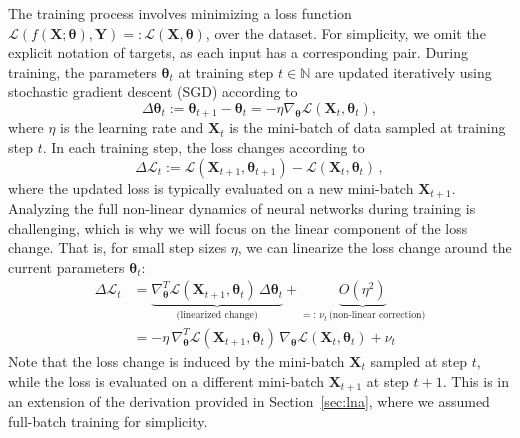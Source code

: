 The training process involves minimizing a loss function \(\mathcal{L}(f(\mathbf{X}; \boldsymbol{\theta}), \mathbf{Y}) =: \mathcal{L}(\mathbf{X}, \boldsymbol{\theta})\), over the dataset. For simplicity, we omit the explicit notation of targets, as each input has a corresponding pair.
During training, the parameters \(\boldsymbol{\theta}_t\) at training step \(t \in \mathbb{N}\) are updated iteratively using stochastic gradient descent (SGD) according to
\begin{equation}
\Delta \boldsymbol{\theta}_t := \boldsymbol{\theta}_{t+1} - \boldsymbol{\theta}_t =  - \eta \nabla_{\boldsymbol{\theta}} \mathcal{L}(\mathbf{X}_t, \boldsymbol{\theta}_t),
\end{equation}
where \(\eta\) is the learning rate and \(\mathbf{X}_t\) is the mini-batch of data sampled at training step \(t\).
In each training step, the loss changes according to
\begin{equation}
    \Delta \mathcal{L}_t := \mathcal{L}(\mathbf{X}_{t+1}, \boldsymbol{\theta}_{t+1}) - \mathcal{L}(\mathbf{X}_t, \boldsymbol{\theta}_t) \, ,
    \label{eq:loss_change_def_app}
\end{equation}
where the updated loss is typically evaluated on a new mini-batch \(\mathbf{X}_{t+1}\).
Analyzing the full non-linear dynamics of neural networks during training is challenging, which is why we will focus on the linear component of the loss change. 
That is, for small step sizes \(\eta\), we can linearize the loss change around the current parameters \(\boldsymbol{\theta}_t\):
\begin{equation}
\begin{split}
    \Delta \mathcal{L}_t
    &= \underbrace{\nabla^T_{\boldsymbol{\theta}} \mathcal{L}(\mathbf{X}_{t+1}, \boldsymbol{\theta}_{t}) \, \Delta \boldsymbol{\theta}_t}_{\text{(linearized change)}}
    + \underbrace{O\!\left(\eta^2\right)}_{=: \, \nu_t \, \text{(non-linear correction)}} \\
    &= -\eta \, \nabla^T_{\boldsymbol{\theta}} \mathcal{L}(\mathbf{X}_{t+1}, \boldsymbol{\theta}_{t}) \, \nabla_{\boldsymbol{\theta}} \mathcal{L}(\mathbf{X}_t, \boldsymbol{\theta}_t) + \nu_t 
    \label{eq:linear_response_app}
\end{split}
\end{equation}
Note that the loss change is induced by the mini-batch \(\mathbf{X}_t\) sampled at step \(t\), while the loss is evaluated on a different mini-batch \(\mathbf{X}_{t+1}\) at step \(t+1\). This is in an extension of the derivation provided in Section~\ref{sec:lna}, where we assumed full-batch training for simplicity.\\

